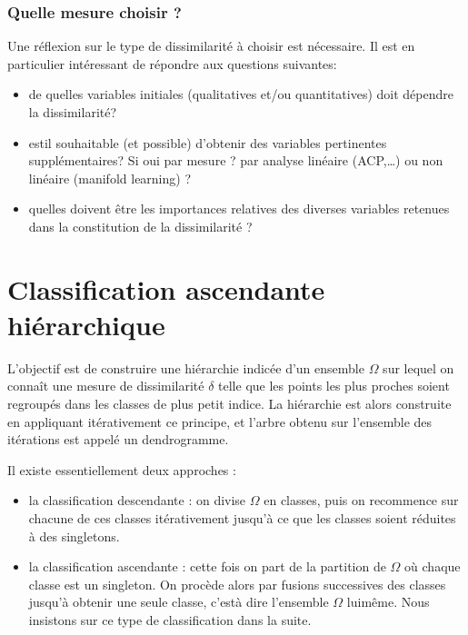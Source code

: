 \documentclass[letterpaper,10pt,french]{sphinxmanual}
\begin{document}
\subsubsection{Quelle mesure choisir ?}
\label{\detokenize{clustering:quelle-mesure-choisir}}
\sphinxAtStartPar
Une réflexion  sur le type de dissimilarité à choisir est nécessaire. Il est en particulier intéressant de répondre aux questions suivantes:
\begin{itemize}
\item {} 
\sphinxAtStartPar
de quelles variables initiales (qualitatives et/ou quantitatives) doit dépendre la dissimilarité?

\item {} 
\sphinxAtStartPar
est\sphinxhyphen{}il souhaitable (et possible) d’obtenir des variables pertinentes supplémentaires? Si oui par mesure ? par analyse linéaire (ACP,…) ou non linéaire (manifold learning) ?

\item {} 
\sphinxAtStartPar
quelles doivent être les importances relatives des diverses variables retenues dans la constitution de la dissimilarité ?

\end{itemize}


\section{Classification ascendante hiérarchique}
\label{\detokenize{clustering:classification-ascendante-hierarchique}}
\sphinxAtStartPar
L’objectif est de construire une hiérarchie indicée d’un ensemble \(\Omega\) sur lequel on connaît une mesure de dissimilarité \(\delta\) telle que les points les plus proches soient regroupés dans les classes de plus petit indice. La hiérarchie est alors construite en appliquant itérativement ce principe, et l’arbre obtenu sur l’ensemble des itérations est appelé un dendrogramme.

\sphinxAtStartPar
Il existe essentiellement
deux approches :
\begin{itemize}
\item {} 
\sphinxAtStartPar
la classification descendante : on divise \(\Omega\) en classes, puis on recommence sur chacune de ces classes itérativement jusqu’à ce que les classes soient réduites à des singletons.

\item {} 
\sphinxAtStartPar
la classification ascendante : cette fois on part de la partition de \(\Omega\)  où chaque classe est un singleton. On procède alors par fusions successives des classes jusqu’à obtenir une seule classe, c’est\sphinxhyphen{}à \sphinxhyphen{}dire l’ensemble  \(\Omega\) lui\sphinxhyphen{}même. Nous insistons sur ce type de classification dans la suite.

\end{itemize}
\end{document}
